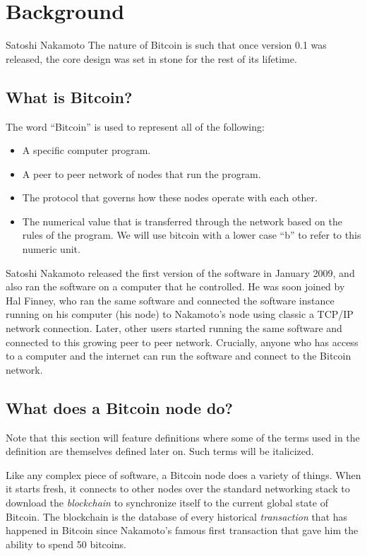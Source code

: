 \chapter{Background}  %
\label{chap:background}

\begin{chapquote}{Satoshi Nakamoto}
The nature of Bitcoin is such that once version 0.1 was released, the core design was set in stone for the rest of its lifetime. 
\end{chapquote}

\section{What is Bitcoin?}
The word ``Bitcoin'' is used to represent all of the following:
\begin{itemize}
    \item A specific computer program.
    \item A peer to peer network of nodes that run the program.
    \item The protocol that governs how these nodes operate with each other.
    \item The numerical value that is transferred through the network based on the rules of the program. We will use bitcoin with a lower case ``b'' to refer to this numeric unit.
\end{itemize}

Satoshi Nakamoto released the first version \cite{satoshi_bitcoin_release_0_1_0} of the software in January 2009, and also ran the software on a computer that he controlled. He was soon joined by Hal Finney, who ran the same software and connected the software instance running on his computer (his node) to Nakamoto's node using classic a TCP/IP network connection. Later, other users started running the same software and connected to this growing peer to peer network. Crucially, anyone who has access to a computer and the internet can run the software and connect to the Bitcoin network. 

\section{What does a Bitcoin node do?}
Note that this section will feature definitions where some of the terms used in the definition are themselves defined later on. Such terms will be italicized. 

Like any complex piece of software, a Bitcoin node does a variety of things. When it starts fresh, it connects to other nodes over the standard networking stack to download the \textit{blockchain} to synchronize itself to the current global state of Bitcoin. The blockchain is the database of every historical \textit{transaction} that has happened in Bitcoin since Nakamoto's famous first transaction that gave him the ability to spend 50 bitcoins. 

